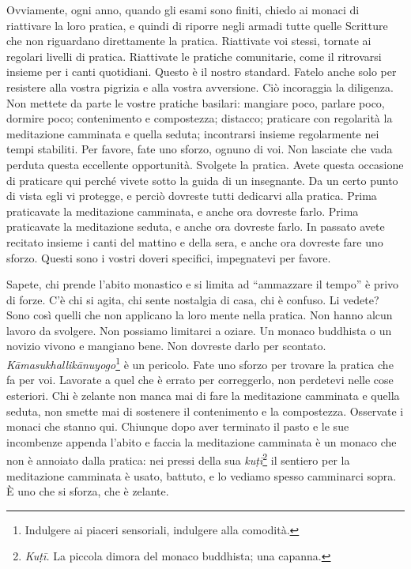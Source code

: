 Ovviamente, ogni anno, quando gli esami sono finiti, chiedo ai monaci di
riattivare la loro pratica, e quindi di riporre negli armadi tutte
quelle Scritture che non riguardano direttamente la pratica. Riattivate
voi stessi, tornate ai regolari livelli di pratica. Riattivate le
pratiche comunitarie, come il ritrovarsi insieme per i canti quotidiani.
Questo è il nostro standard. Fatelo anche solo per resistere alla vostra
pigrizia e alla vostra avversione. Ciò incoraggia la diligenza. Non
mettete da parte le vostre pratiche basilari: mangiare poco, parlare
poco, dormire poco; contenimento e compostezza; distacco; praticare con
regolarità la meditazione camminata e quella seduta; incontrarsi insieme
regolarmente nei tempi stabiliti. Per favore, fate uno sforzo, ognuno di
voi. Non lasciate che vada perduta questa eccellente opportunità.
Svolgete la pratica. Avete questa occasione di praticare qui perché
vivete sotto la guida di un insegnante. Da un certo punto di vista egli
vi protegge, e perciò dovreste tutti dedicarvi alla pratica. Prima
praticavate la meditazione camminata, e anche ora dovreste farlo. Prima
praticavate la meditazione seduta, e anche ora dovreste farlo. In
passato avete recitato insieme i canti del mattino e della sera, e anche
ora dovreste fare uno sforzo. Questi sono i vostri doveri specifici,
impegnatevi per favore.

Sapete, chi prende l'abito monastico e si limita ad ``ammazzare il
tempo'' è privo di forze. C'è chi si agita, chi sente nostalgia di casa,
chi è confuso. Li vedete? Sono così quelli che non applicano la loro
mente nella pratica. Non hanno alcun lavoro da svolgere. Non possiamo
limitarci a oziare. Un monaco buddhista o un novizio vivono e mangiano
bene. Non dovreste darlo per scontato.
\emph{Kāmasukhallikānuyogo}\footnote{Indulgere ai piaceri sensoriali,
  indulgere alla comodità.} è un pericolo. Fate uno sforzo per trovare
la pratica che fa per voi. Lavorate a quel che è errato per correggerlo,
non perdetevi nelle cose esteriori. Chi è zelante non manca mai di fare
la meditazione camminata e quella seduta, non smette mai di sostenere il
contenimento e la compostezza. Osservate i monaci che stanno qui.
Chiunque dopo aver terminato il pasto e le sue incombenze appenda
l'abito e faccia la meditazione camminata è un monaco che non è annoiato
dalla pratica: nei pressi della sua
\emph{kuṭī}\footnote{\emph{Kuṭī.} La piccola dimora
  del monaco buddhista; una capanna.} il sentiero per la meditazione
camminata è usato, battuto, e lo vediamo spesso camminarci sopra. È uno
che si sforza, che è zelante.


